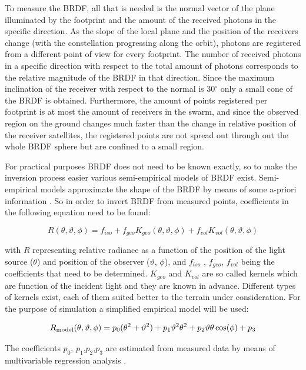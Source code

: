 To measure the \ac{BRDF}, all that is needed is the normal vector of the plane illuminated by the footprint and the amount of the received photons in the specific direction. As the slope of the local plane and the position of the receivers change (with the constellation progressing along the orbit), photons are registered from a different point of view for every footprint. The number of received photons in a specific direction with respect to the total amount of photons corresponds to the relative magnitude of the \ac{BRDF} in that direction. Since the maximum inclination of the receiver with respect to the normal is $30^\circ$ only a small cone of the \ac{BRDF} is obtained. Furthermore, the amount of points registered per footprint is at most the amount of receivers in the swarm, and since the observed region on the ground changes much faster than the change in relative position of the receiver satellites, the registered points are not spread out through out the whole \ac{BRDF} sphere but are confined to a small region. 

For practical purposes \ac{BRDF} does not need to be known exactly, so to make the inversion process easier various semi-empirical models of \ac{BRDF} exist. Semi-empirical models approximate the shape of the \ac{BRDF} by means of some a-priori information \cite{BRDFwanner}. So in order to invert \ac{BRDF} from measured points, coefficients in the following equation need to be found:

\[
R(\theta ,\vartheta ,\phi ) = f_{iso}  + f_{geo} K_{geo} (\theta ,\vartheta ,\phi ) + f_{vol} K_{vol} (\theta ,\vartheta ,\phi )
\]


with $R$ representing relative radiance as a function of the position of the light source ($\theta$) and position of the observer ($\vartheta$, $\phi$), and $f_{iso}$  , $f_{geo}$, $f_{vol}$  being the coefficients that need to be determined. $K_{geo}$ and $K_{vol}$ are so called kernels which are function of the incident light and they are known in advance. Different types of kernels exist, each of them suited better to the terrain under consideration. 
For the purpose of simulation a simplified empirical model will be used:

\[
R_{{\rm{model}}} (\theta ,\vartheta ,\phi ){\rm{ }} = {\rm{ }}p_0 (\theta _{}^2  + \vartheta _{}^2 ) + p_1 \vartheta _{}^2 \theta _{}^2  + p_2 \vartheta \theta \cos (\phi ) + p_3 
\]

The coefficients $p_0$, $p_1$,$p_2$,$p_3$ are estimated from measured data by means of multivariable regression analysis \cite{BRDFrob}. 

